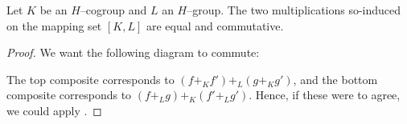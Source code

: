 \begin{corollary}
Let $K$ be an $H$--cogroup and $L$ an $H$--group.
The two multiplications so-induced on the mapping set $[K, L]$ are equal and commutative.
\end{corollary}
\begin{proof}
We want the following diagram to commute:
\begin{center}
\end{center}
The top composite corresponds to $(f +_K f') +_L (g +_K g')$, and the bottom composite corresponds to $(f +_L g) +_K (f' +_L g')$.
Hence, if these were to agree, we could apply .


\end{proof}
